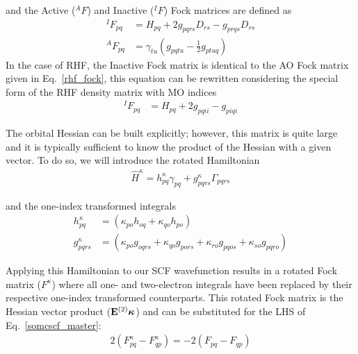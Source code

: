 \documentclass[aip,jcp,preprint,superscriptaddress,floatfix]{revtex4-1}
\begin{document}
and the Active (${^AF}$) and Inactive (${^IF}$) Fock matrices are defined as
\begin{align}
{^IF}_{pq} &= H_{pq} + 2 g_{pqrs} D_{rs} - g_{prqs} D_{rs}\\
{^AF}_{pq} &=\gamma_{tu} (g_{pqtu} - \frac{1}{2} g_{ptuq})
\end{align}
In the case of RHF, the Inactive Fock matrix is identical to the AO Fock matrix given in Eq.~\ref{rhf_fock}, this equation can be rewritten considering the special form of the RHF density matrix with MO indices
\begin{align}
{^IF}_{pq} &= H_{pq} + 2 g_{pqii} - g_{piqi}
\end{align}


The orbital Hessian can be built explicitly; however, this matrix is quite large and it is typically sufficient to know the product of the Hessian with a given vector.
To do so, we will introduce the rotated Hamiltonian
\begin{eqnarray}
\hat{H}^\kappa = h^\kappa_{pq}\gamma_{pq} + g^\kappa_{pqrs}\Gamma_{pqrs}
\end{eqnarray}

and the one-index transformed integrals
\begin{align}
h^{\kappa}_{pq} &=  (\kappa_{po}h_{oq} + \kappa_{qo}h_{po})\\
g^{\kappa}_{pqrs} &= (\kappa_{po}g_{oqrs} + \kappa_{qo}g_{pors} +\kappa_{ro}g_{pqos} + \kappa_{so}g_{pqro})
\end{align}

Applying this Hamiltonian to our SCF wavefunction results in a rotated Fock matrix ($F^\kappa$) where all one- and two-electron integrals have been replaced by their respective one-index transformed counterparts.
This rotated Fock matrix is the Hessian vector product (${\bf E}^{(2)}{\bm \kappa}$) and can be substituted for the LHS of Eq.~\ref{somcscf_master}:
\begin{eqnarray}
2(F^{\kappa}_{pq} - F^{\kappa}_{qp}) = -2(F_{pq} - F_{qp})
\end{eqnarray}
\end{document}
